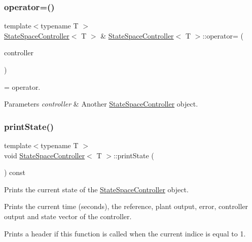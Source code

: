 \subsubsection{\texorpdfstring{operator=()}{operator=()}}
{\footnotesize\ttfamily template$<$typename T $>$ \\
\hyperlink{classStateSpaceController}{State\+Space\+Controller}$<$ T $>$ \& \hyperlink{classStateSpaceController}{State\+Space\+Controller}$<$ T $>$\+::operator= (\begin{DoxyParamCaption}\item[{const \hyperlink{classStateSpaceController}{State\+Space\+Controller}$<$ T $>$ \&}]{controller }\end{DoxyParamCaption})}



= operator. 


\begin{DoxyParams}{Parameters}
{\em controller} & Another \hyperlink{classStateSpaceController}{State\+Space\+Controller} object. \\
\hline
\end{DoxyParams}
\mbox{\label{classStateSpaceController_aeded9d7ac25593444de4448a4369064d}} 
\subsubsection{\texorpdfstring{print\+State()}{printState()}}
{\footnotesize\ttfamily template$<$typename T $>$ \\
void \hyperlink{classStateSpaceController}{State\+Space\+Controller}$<$ T $>$\+::print\+State (\begin{DoxyParamCaption}{ }\end{DoxyParamCaption}) const}



Prints the current state of the \hyperlink{classStateSpaceController}{State\+Space\+Controller} object. 

Prints the current time (seconds), the reference, plant output, error, controller output and state vector of the controller.

Prints a header if this function is called when the current indice is equal to 1. \mbox{\label{classStateSpaceController_a3a32ed909b03a681e9c9a04bff3ae45d}} 
